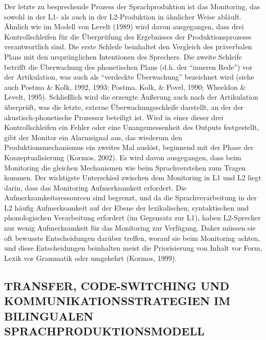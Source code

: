 \documentclass[
  letterpaper,
]{scrbook}
\begin{document}
Der letzte zu besprechende Prozess der Sprachproduktion ist das
Monitoring, das sowohl in der L1- als auch in der L2-Produktion in
ähnlicher Weise abläuft. Ähnlich wie im Modell von Levelt (1989) wird
davon ausgegangen, dass drei Kontrollschleifen für die Überprüfung des
Ergebnisses der Produktionsprozesse verantwortlich sind. Die erste
Schleife beinhaltet den Vergleich des präverbalen Plans mit den
ursprünglichen Intentionen des Sprechers. Die zweite Schleife betrifft
die Überwachung des phonetischen Plans (d.h. der ``inneren Rede'') vor
der Artikulation, was auch als ``verdeckte Überwachung'' bezeichnet wird
(siehe auch Postma \& Kolk, 1992, 1993; Postma, Kolk, \& Povel, 1990;
Wheeldon \& Levelt, 1995). Schließlich wird die erzeugte Äußerung auch
nach der Artikulation überprüft, was die letzte, externe
Überwachungsschleife darstellt, an der der akustisch-phonetische
Prozessor beteiligt ist. Wird in einer dieser drei Kontrollschleifen ein
Fehler oder eine Unangemessenheit des Outputs festgestellt, gibt der
Monitor ein Alarmsignal aus, das wiederum den Produktionsmechanismus ein
zweites Mal auslöst, beginnend mit der Phase der Konzeptualisierung
(Kormos, 2002). Es wird davon ausgegangen, dass beim Monitoring die
gleichen Mechanismen wie beim Sprachverstehen zum Tragen kommen. Der
wichtigste Unterschied zwischen dem Monitoring in L1 und L2 liegt darin,
dass das Monitoring Aufmerksamkeit erfordert. Die
Aufmerksamkeitsressourcen sind begrenzt, und da die Sprachverarbeitung
in der L2 häufig Aufmerksamkeit auf der Ebene der lexikalischen,
syntaktischen und phonologischen Verarbeitung erfordert (im Gegensatz
zur L1), haben L2-Sprecher nur wenig Aufmerksamkeit für das Monitoring
zur Verfügung. Daher müssen sie oft bewusste Entscheidungen darüber
treffen, worauf sie beim Monitoring achten, und diese Entscheidungen
beinhalten meist die Priorisierung von Inhalt vor Form, Lexik vor
Grammatik oder umgekehrt (Kormos, 1999).

\hypertarget{transfer-code-switching-und-kommunikationsstrategien-im-bilingualen-sprachproduktionsmodell}{%
\subsection{TRANSFER, CODE-SWITCHING UND KOMMUNIKATIONSSTRATEGIEN IM
BILINGUALEN
SPRACHPRODUKTIONSMODELL}\label{transfer-code-switching-und-kommunikationsstrategien-im-bilingualen-sprachproduktionsmodell}}
\end{document}
